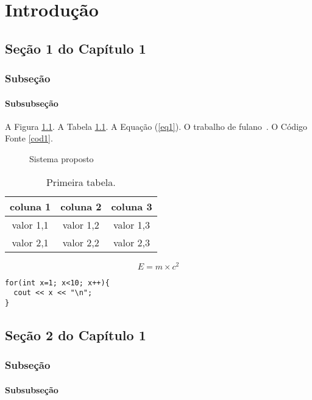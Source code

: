 \chapter{Introdu\c{c}\~{a}o}

\section{Se\c{c}\~{a}o 1 do Capítulo 1}
\subsection{Subseção}
\subsubsection{Subsubseção}

A Figura \ref{fig:sistemaProposto}. A Tabela \ref{tab:tabelaTeste}. A Equação (\ref{eq1}). O trabalho de fulano~\cite{ref1}. O Código Fonte \ref{cod1}.

\begin{figure}[htbp]	
\begin{center}
	\end{center}
	\caption{Sistema proposto}
	\label{fig:sistemaProposto}
\end{figure}

\begin{table}[htpb]
\begin{center}
\begin{tabular}{|c|c|c|}
\hline
coluna 1 & coluna 2 & coluna 3 \\
\hline
valor 1,1 & valor 1,2 & valor 1,3 \\
valor 2,1 & valor 2,2 & valor 2,3 \\
\hline
\end{tabular}
\end{center}
\caption{Primeira tabela.}
\label{tab:tabelaTeste}
\end{table}

\begin{equation}
E = m \times c^2
\label{eq1}
\end{equation}

\begin{lstlisting}[caption={Loop simples},label=cod1,numbers=none]
for(int x=1; x<10; x++){
  cout << x << "\n";
}
\end{lstlisting}

\section{Se\c{c}\~{a}o 2 do Capítulo 1}  
\subsection{Subseção}
\subsubsection{Subsubseção}

